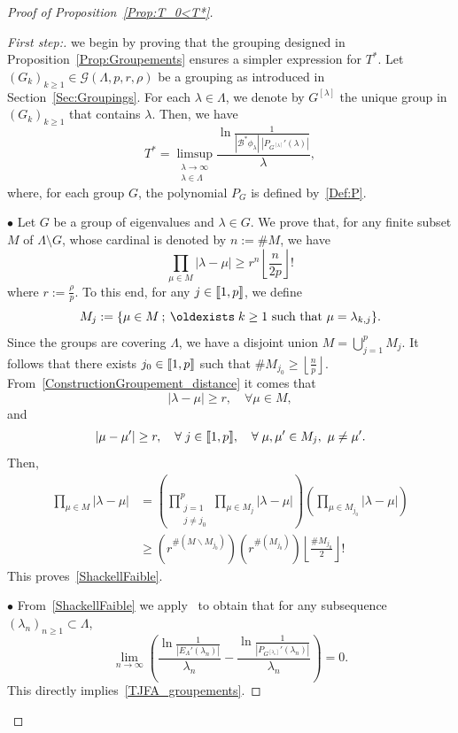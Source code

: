 \documentclass[10pt]{amsart}
\theoremstyle{definition}\newtheorem{defi}[theo]{Definition}\newtheorem{rema}[theo]{Remark}\newtheorem{exam}[theo]{Example}\newtheorem{exem}[theo]{Example}\newtheorem{nota}[theo]{Notation}
\newenvironment{step}[1]{\begin{proof}[#1]}{\let\qed\relax\end{proof}}
\newcommand{\llbracket}{\mathopen{[\mkern -2.7mu[}}
\newcommand{\rrbracket}{\mathclose{]\mkern -2.7mu]}}
\newcommand{\inter}[2]{\llbracket #1,#2 \rrbracket}
\newcommand\Bs{\mathcal{B}^*}
\renewcommand*{\exists}{\mathrel{\oldexists}}
\let\oldforall\forall
\renewcommand*{\forall}{\mathrel{\oldforall}}
\newenvironment{proofc}[1][\proofname]{\begin{proof}[{#1}]}{\end{proof}}
\begin{document}
\begin{proofc}[{Proof of Proposition~\ref{Prop:T_0<T*}}]
\begin{step}{First step:}
we begin by proving that the grouping designed in Proposition~\ref{Prop:Groupements} ensures a simpler expression for $T^*$. Let $(G_k)_{k \geq 1}\in \mathcal{G}(\Lambda,p,r,\rho)$ be a grouping as introduced in Section~\ref{Sec:Groupings}. For each $\lambda\in \Lambda$, we denote by $G^{[\lambda]}$ the unique group in $(G_k)_{k\geq 1}$ that contains $\lambda$. Then, we have
\begin{equation}\label{TJFA_groupements}
T^*=\limsup_{\substack{\lambda\to \infty\\ \lambda\in \Lambda}} \frac{\ln \frac{1}{| \Bs\phi_\lambda | \: | P_{G^{[\lambda]}}' (\lambda) |}}{ \lambda },
\end{equation}
where, for each group $G$, the polynomial $P_G$ is defined by~\eqref{Def:P}.


\noindent $\bullet$ Let $G$ be a group of eigenvalues and $\lambda \in G$. We prove that, for any finite subset $M$ of $\Lambda\setminus G$, whose cardinal is denoted by $n:=\# M$, we have
\begin{equation}\label{ShackellFaible}
\prod_{\mu \in M} |\lambda- \mu| \geq r^n \left\lfloor \frac{n}{2p} \right\rfloor !
\end{equation}
where $r:= \frac{\rho}{p}$. To this end, for any $j \in \inter{1}{p}$, we define
\[
M_j := \{ \mu\in M \: ; \: \exists k \geq 1 \text{ such that } \mu = \lambda_{k,j} \}.
\]
Since the groups are covering $\Lambda$, we have a disjoint union $M = \displaystyle\bigcup_{j=1}^p M_j$. It follows that there exists $j_0 \in \inter{1}{p}$ such that $\# M_{j_0} \geq \left\lfloor \frac{n}{p} \right\rfloor$. From~\eqref{ConstructionGroupement_distance} it comes that
\[
|\lambda - \mu | \geq r, \quad \forall \mu \in M,
\]
and
\[
|\mu - \mu'| \geq r, \quad \forall j \in \inter{1}{p},\quad\forall \mu, \mu' \in M_j, \ \mu\neq \mu'.
\]
Then,
\begin{align*}
\prod_{\mu \in M} |\lambda- \mu| &= \left(\prod_{\substack{j=1 \\ j \neq j_0}}^p \prod_{\mu \in M_j} |\lambda-\mu| \right) \left(\prod_{\mu \in M_{j_0}} |\lambda-\mu|\right)
\\
&\geq \left(r^{\# (M\backslash M_{j_0})} \right) \left(r^{\# (M_{j_0})}\right) \left\lfloor \frac{\#M_{j_0}}{2} \right\rfloor!
\end{align*}
This proves~\eqref{ShackellFaible}.

\medskip
\noindent $\bullet$ From~\eqref{ShackellFaible} we apply~\cite[Theorem~3.8]{AmmarKhodjaBenabdallahGonzalez-BurgosdeTeresa:2014} to obtain that for any subsequence $(\lambda_n)_{n \geq 1} \subset \Lambda$,
\begin{equation}\label{JFA_Th3.8}
\lim_{n \to \infty} \left(\frac{\ln \frac{1}{|E_\Lambda'(\lambda_n)|}}{\lambda_n} - \frac{\ln \frac{1}{|P_{G^{[\lambda_n]}}'(\lambda_n)|}}{\lambda_n} \right) = 0.
\end{equation}
This directly implies~\eqref{TJFA_groupements}.


\end{step}
\end{proofc}
\end{document}
